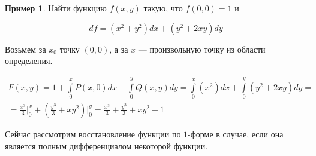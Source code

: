 \documentclass[a5paper]{article}
\newcounter{through}
\theoremstyle{plain}
\theoremstyle{definition}
\newtheorem{example}[through]{Пример}
\numberwithin{through}{section}
\numberwithin{equation}{section}
\begin{document}
\begin{example}\label{v1c2}
	Найти функцию $f(x, y)$ такую, что $f(0, 0) = 1$ и
	
	\begin{equation*}
	df = (x^2 + y^2)dx + (y^2 + 2xy)dy
	\end{equation*}
	
	Возьмем за $x_0$ точку $(0, 0)$, а за $x$ --- произвольную точку из области определения.
	
	\begin{align*}
	F(x, y) =  1 + \int\limits_{0}^{x}P(x, 0)dx + \int\limits_{0}^{y} Q(x, y) dy = \int\limits_{0}^{x} (x^2)dx + \int\limits_{0}^{y} (y^2 + 2xy) dy = \\ = \frac{x^3}{3} \bigg|_{0}^{x} + (\frac{y^3}{3} + xy^2)\bigg|_{0}^{y} = \frac{x^3}{3} + \frac{y^3}{3} + xy^2 + 1
	\end{align*}
\end{example}



Сейчас рассмотрим восстановление функции по $1$-форме в случае, если она является полным дифференциалом некоторой функции.
\end{document}

